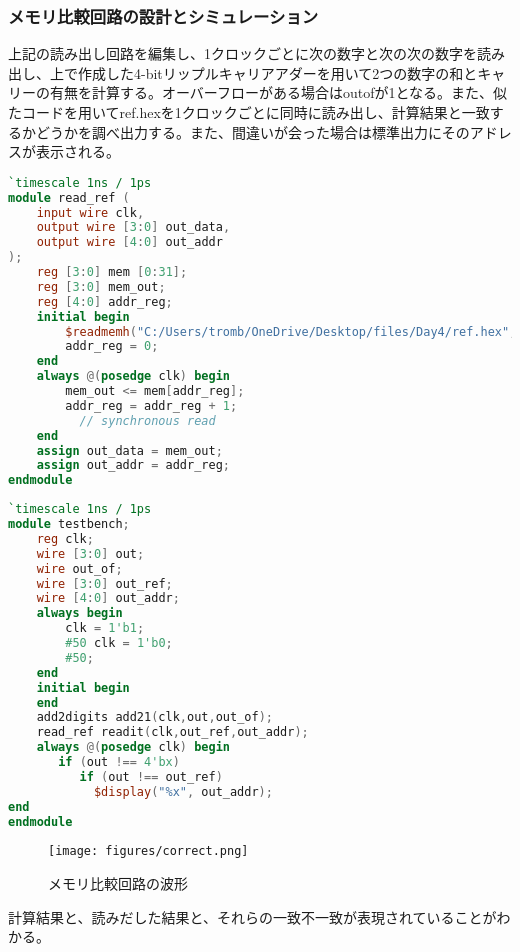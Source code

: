 \documentclass[titlepage]{ltjsarticle}
\begin{document}
\subsubsection{メモリ比較回路の設計とシミュレーション}
上記の読み出し回路を編集し、1クロックごとに次の数字と次の次の数字を読み出し、上で作成した4-bitリップルキャリアアダーを用いて2つの数字の和とキャリーの有無を計算する。オーバーフローがある場合はoutofが1となる。また、似たコードを用いてref.hexを1クロックごとに同時に読み出し、計算結果と一致するかどうかを調べ出力する。また、間違いが会った場合は標準出力にそのアドレスが表示される。
\begin{lstlisting}[caption=ref.hex読み出し回路デザイン,language=verilog]
`timescale 1ns / 1ps
module read_ref ( 
    input wire clk,
    output wire [3:0] out_data,
    output wire [4:0] out_addr
);
    reg [3:0] mem [0:31];
    reg [3:0] mem_out;
    reg [4:0] addr_reg;
    initial begin
        $readmemh("C:/Users/tromb/OneDrive/Desktop/files/Day4/ref.hex", mem);
        addr_reg = 0;
    end
    always @(posedge clk) begin
        mem_out <= mem[addr_reg];
        addr_reg = addr_reg + 1;
          // synchronous read
    end
    assign out_data = mem_out;
    assign out_addr = addr_reg;
endmodule
\end{lstlisting}
\begin{lstlisting}[caption=メモリ比較回路テストベンチ,language=verilog]
`timescale 1ns / 1ps
module testbench;
	reg clk;
	wire [3:0] out;
	wire out_of;
	wire [3:0] out_ref;
	wire [4:0] out_addr;
	always begin
		clk = 1'b1;
		#50 clk = 1'b0;
		#50;
	end
	initial begin  
	end
	add2digits add21(clk,out,out_of);
	read_ref readit(clk,out_ref,out_addr);
	always @(posedge clk) begin
	   if (out !== 4'bx)
	   	  if (out !== out_ref)
	        $display("%x", out_addr);
end
endmodule
\end{lstlisting}
\begin{figure}[H]
    \begin{center}
        \texttt{[image: figures/correct.png]}
        \caption{メモリ比較回路の波形}
    \end{center}
\end{figure}
計算結果と、読みだした結果と、それらの一致不一致が表現されていることがわかる。
\end{document}
